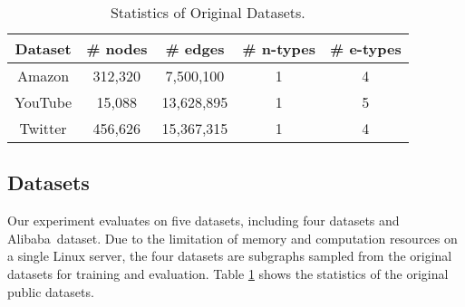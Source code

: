 \documentclass[sigconf]{acmart}
\newcommand{\company}{Alibaba}
\begin{document}
\begin{table}
  \centering
  \caption{\label{tab:stats_origin} Statistics of Original Datasets.}
\begin{tabular}{c|c|c|c|c}
    \hline \hline
    \textbf{Dataset} & \# nodes & \# edges & \# n-types & \# e-types \\
    \hline
    Amazon & 312,320 & 7,500,100 & 1 & 4 \\
YouTube & 15,088 & 13,628,895 & 1 & 5 \\
Twitter & 456,626 & 15,367,315 & 1 & 4 \\
\hline \hline
  \end{tabular}
\end{table}

\subsection{Datasets}
Our experiment evaluates on five datasets, including four datasets and \company\ dataset. Due to the limitation of memory and computation resources on a single Linux server, the four datasets are subgraphs sampled from the original datasets for training and evaluation. Table \ref{tab:stats_origin} shows the statistics of the original public datasets. 
\end{document}
